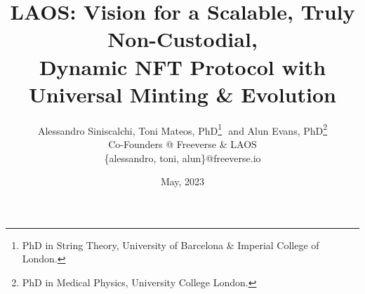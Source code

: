 \documentclass{article}
\title{LAOS: Vision for a Scalable, Truly Non-Custodial,\\Dynamic NFT Protocol with Universal Minting \& Evolution }
\author{
  Alessandro Siniscalchi,
  Toni Mateos, PhD\footnote{PhD in String Theory, University of Barcelona \& Imperial College of London.}
  $ $ and Alun Evans, PhD\footnote{PhD in Medical Physics, University College London.}
  \\
  Co-Founders @ Freeverse \& LAOS \\
  \{alessandro, toni, alun\}@freeverse.io
}
\date{May, 2023}
\begin{document}
\maketitle




\setlength{\columnsep}{20pt}
\begin{multicols}{2}











\end{multicols}
\end{document}
